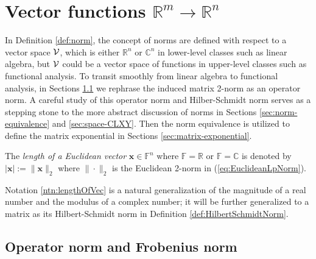 \section{Vector functions
  $\mathbb{R}^m\rightarrow\mathbb{R}^n$}
\label{sec:sever-vari-diff}

\begin{rem} 
  In Definition \ref{def:norm},
  the concept of norms are defined with respect
  to a vector space ${\cal V}$,
  which is either $\mathbb{R}^n$ or $\mathbb{C}^n$
  in lower-level classes such as linear algebra,
  but ${\cal V}$ could be a vector space of functions
  in upper-level classes such as
  functional analysis.
  To transit smoothly from linear algebra
  to functional analysis,
  in Sections \ref{sec:operator-norm}
  we rephrase the induced matrix 2-norm
  as an operator norm.
  A careful study of this operator norm
  and Hilber-Schmidt norm
  serves as a stepping stone
  to the more abstract discussion of norms
  in Sections \ref{sec:norm-equivalence}
  and \ref{sec:space-CLXY}.
  Then the norm equivalence is utilized
  to define the matrix exponential
  in Sections \ref{sec:matrix-exponential}.
\end{rem}

\begin{ntn}
  \label{ntn:lengthOfVec}
  The \emph{length of a Euclidean vector}
  $\mathbf{x}\in \mathbb{F}^n$
  where $\mathbb{F}=\mathbb{R}$ or $\mathbb{F}=\mathbb{C}$
  is denoted by $|\mathbf{x}|:=\|\mathbf{x}\|_2$
  where $\|\cdot\|_2$ is
  the Euclidean 2-norm in (\ref{eq:EuclideanLpNorm}).
\end{ntn}

\begin{rem}
  Notation \ref{ntn:lengthOfVec} is a natural generalization
  of the magnitude of a real number and the modulus of a complex number;
  it will be further generalized to a matrix as its Hilbert-Schmidt norm
  in Definition \ref{def:HilbertSchmidtNorm}.
\end{rem}


\subsection{Operator norm and Frobenius norm}
\label{sec:operator-norm}

